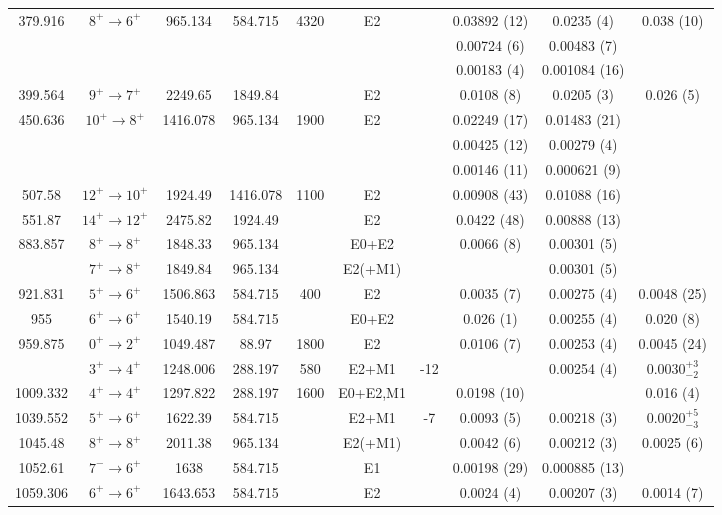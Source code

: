 \begin{landscape}
\begin{longtable}{c|c|c|c|c|c|c|c|c|c}
379.916	&	$8^+	\rightarrow	6^+$	&	965.134	&	584.715	&	4320	&	E2	&		&	0.03892 (12)	&	0.0235 (4)	&	0.038 (10)	\\
	&				&		&		&		&		&		&	0.00724 (6)	&	0.00483 (7)	&		\\
	&				&		&		&		&		&		&	0.00183 (4)	&	0.001084 (16)	&		\\
399.564	&	$9^+	\rightarrow	7^+$	&	2249.65	&	1849.84	&		&	E2	&		&	0.0108 (8)	&	0.0205 (3)	&	0.026 (5)	\\
450.636	&	$10^+	\rightarrow	8^+$	&	1416.078	&	965.134	&	1900	&	E2	&		&	0.02249 (17)	&	0.01483 (21)	&		\\
	&				&		&		&		&		&		&	0.00425 (12)	&	0.00279 (4)	&		\\
	&				&		&		&		&		&		&	0.00146 (11)	&	0.000621 (9)	&		\\
507.58	&	$12^+	\rightarrow	10^+$	&	1924.49	&	1416.078	&	1100	&	E2	&		&	0.00908 (43)	&	0.01088 (16)	&		\\
551.87	&	$14^+	\rightarrow	12^+$	&	2475.82	&	1924.49	&		&	E2	&		&	0.0422 (48)	&	0.00888 (13)	&		\\
883.857	&	$8^+	\rightarrow	8^+$	&	1848.33	&	965.134	&		&	E0+E2	&		&	0.0066 (8)	&	0.00301 (5)	&		\\
	&	$7^+	\rightarrow	8^+$	&	1849.84	&	965.134	&		&	E2(+M1)	&		&		&	0.00301 (5)	&		\\
921.831	&	$5^+	\rightarrow	6^+$	&	1506.863	&	584.715	&	400	&	E2	&		&	0.0035 (7)	&	0.00275 (4)	&	0.0048 (25)	\\
955	&	$6^+	\rightarrow	6^+$	&	1540.19	&	584.715	&		&	E0+E2	&		&	0.026 (1)	&	0.00255 (4)	&	0.020 (8)	\\
959.875	&	$0^+	\rightarrow	2^+$	&	1049.487	&	88.97	&	1800	&	E2	&		&	0.0106 (7)	&	0.00253 (4)	&	0.0045 (24)	\\
	&	$3^+	\rightarrow	4^+$	&	1248.006	&	288.197	&	580	&	E2+M1	&	-12	&		&	0.00254 (4)	&	$0.0030_{-2}^{+3}$	\\
1009.332	&	$4^+	\rightarrow	4^+$	&	1297.822	&	288.197	&	1600	&	E0+E2,M1	&		&	0.0198 (10)	&		&	0.016 (4)	\\
1039.552	&	$5^+	\rightarrow	6^+$	&	1622.39	&	584.715	&		&	E2+M1	&	-7	&	0.0093 (5)	&	0.00218 (3)	&	$0.0020^{+5}_{-3}$	\\
1045.48	&	$8^+	\rightarrow	8^+$	&	2011.38	&	965.134	&		&	E2(+M1)	&		&	0.0042 (6)	&	0.00212 (3)	&	0.0025 (6)	\\
1052.61	&	$7^-	\rightarrow	6^+$	&	1638	&	584.715	&		&	E1	&		&	0.00198 (29)	&	0.000885 (13)	&		\\
1059.306	&	$6^+	\rightarrow	6^+$	&	1643.653	&	584.715	&		&	E2	&		&	0.0024 (4)	&	0.00207 (3)	&	0.0014 (7)	\\

\end{longtable}
\end{landscape}
